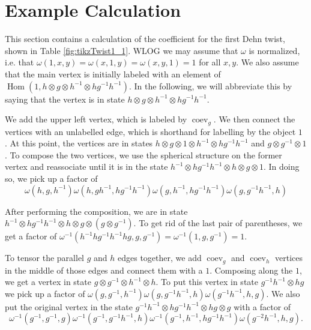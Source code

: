 \documentclass{amsart}
\DeclareMathOperator{\Hom}{Hom}
\DeclareMathOperator{\coev}{coev}
\begin{document}
\section{Example Calculation}
This section contains a calculation of the coefficient for the first Dehn twist, shown in Table \ref{fig:tikzTwist1_1}.  WLOG we may assume that $\omega$ is normalized, i.e. that $\omega(1,x,y) = \omega(x,1,y) = \omega(x,y,1) = 1$ for all $x,y$.  We also assume that the main vertex is initially labeled with an element of $\Hom(1, h \otimes g \otimes h^{-1} \otimes hg^{-1}h^{-1})$.   In the following, we will abbreviate this by saying that the vertex is in state $h \otimes g \otimes h^{-1} \otimes hg^{-1}h^{-1}$.

We add the upper left vertex, which is labeled by  $\coev_g$.  We then connect the vertices with an unlabelled edge, which is shorthand for labelling by the object $1$ .  At this point, the vertices are in states $h \otimes g \otimes 1 \otimes h^{-1} \otimes hg^{-1}h^{-1}$ and $g \otimes g^{-1}  \otimes 1$.  To compose the two vertices, we use the spherical structure on the former vertex and reassociate until it is in the state $h^{-1} \otimes h g^{-1} h^{-1} \otimes h \otimes g \otimes 1$.  In doing so, we pick up a factor of 
$$ \omega(h, g, h^{-1}) \omega(h, gh^{-1}, hg^{-1}h^{-1}) \omega(g, h^{-1}, hg^{-1}h^{-1}) \omega(g, g^{-1}h^{-1}, h) $$

After performing the composition, we are in state $h^{-1} \otimes hg^{-1}h^{-1} \otimes h \otimes g \otimes (g \otimes g^{-1})$.  To get rid of the last pair of parentheses, we get a factor of $\omega^{-1}(h^{-1}hg^{-1}h^{-1}hg, g, g^{-1}) = \omega^{-1}(1, g, g^{-1}) = 1$.   

To tensor the parallel $g$ and $h$ edges together, we add $\coev_g$ and $\coev_h$ vertices in the middle of those edges and connect them with a $1$.  Composing along the $1$, we get a vertex in state $g \otimes g^{-1} \otimes h^{-1} \otimes h$.  To put this vertex in state $g^{-1}h^{-1} \otimes hg$ we pick up a factor of $\omega(g, g^{-1}, h^{-1}) \omega(g, g^{-1}h^{-1}, h) \omega(g^{-1}h^{-1}, h, g)$.   We also put the original vertex in the state $g^{-1}h^{-1} \otimes hg^{-1}h^{-1} \otimes hg \otimes g$ with a factor of
$$\omega^{-1}(g^{-1}, g^{-1}, g) \omega^{-1}(g^{-1}, g^{-1}h^{-1}, h) \omega^{-1}(g^{-1}, h^{-1}, hg^{-1}h^{-1}) \omega(g^{-2}h^{-1}, h, g). $$
\end{document}
